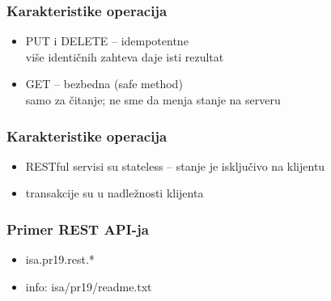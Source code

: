 \documentclass[compress]{beamer}
\begin{document}
\begin{frame}
  \frametitle{Karakteristike operacija}
\begin{itemize}
\item PUT i DELETE -- idempotentne \\ više identičnih zahteva daje isti rezultat
\item GET -- bezbedna (safe method) \\ samo za čitanje; ne sme da menja stanje na serveru
\end{itemize}
\end{frame}

\begin{frame}
  \frametitle{Karakteristike operacija}
\begin{itemize}
  \item RESTful servisi su stateless -- stanje je isključivo na klijentu
  \item transakcije su u nadležnosti klijenta
\end{itemize}
\end{frame}

\begin{frame}
  \frametitle{Primer REST API-ja}
\begin{itemize}
  \item isa.pr19.rest.*
  \item info: isa/pr19/readme.txt
\end{itemize}
\end{frame}
\end{document}
